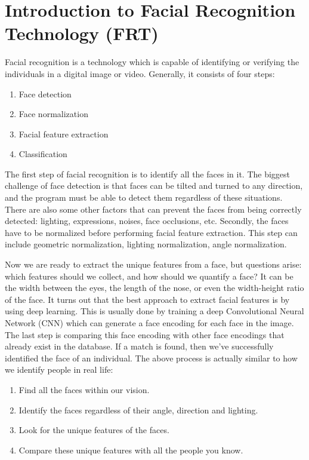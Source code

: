 \section{Introduction to Facial Recognition Technology (FRT)}
Facial recognition is a technology which is capable of identifying or verifying the individuals in a digital image or video.
Generally, it consists of four steps:

\vspace{0.5cm}
\begin{enumerate}
  \item Face detection
  \item Face normalization
  \item Facial feature extraction
  \item Classification
\end{enumerate}
\setstretch{\contentLineSpacing}

The first step of facial recognition is to identify all the faces in it. The biggest challenge of face detection
is that faces can be tilted and turned to any direction, and the program must be able to detect them regardless of
these situations. There are also some other factors that can prevent the faces from being correctly detected:
lighting, expressions, noises, face occlusions, etc. Secondly, the faces have to be normalized before performing
facial feature extraction. This step can include geometric normalization, lighting normalization, angle normalization.

Now we are ready to extract the unique features from a face, but questions arise: which features should we collect, and
how should we quantify a face? It can be the width between the eyes, the length of the nose, or even the width-height ratio
of the face. It turns out that the best approach to extract facial features is by using deep learning.
This is usually done by training a deep Convolutional Neural Network (CNN) which can generate a face encoding for each face
in the image. The last step is comparing this face encoding with other face encodings that already exist in the database.
If a match is found, then we've successfully identified the face of an individual. The above process is actually similar to
how we identify people in real life:

\vspace{0.5cm}
\begin{enumerate}
  \item Find all the faces within our vision.
  \item Identify the faces regardless of their angle, direction and lighting.
  \item Look for the unique features of the faces.
  \item Compare these unique features with all the people you know.
\end{enumerate}
\setstretch{\contentLineSpacing}


